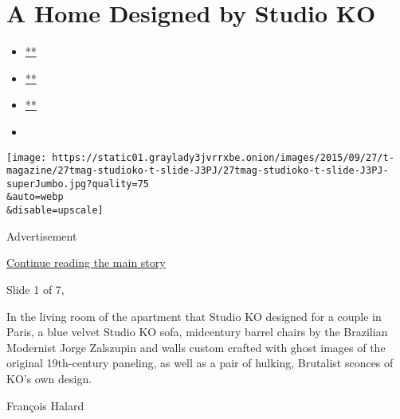 \hypertarget{a-home-designed-by-studio-ko}{%
\section{A Home Designed by Studio
KO}\label{a-home-designed-by-studio-ko}}

\begin{itemize}
\item
  \href{https://www.facebookcorewwwi.onion/sharer.php?app_id=9869919170\&u=https\%3A\%2F\%2Fwww.nytimes3xbfgragh.onion\%2Fslideshow\%2F2015\%2F09\%2F27\%2Ft-magazine\%2Fa-home-designed-by-studio-ko.html\%3Fsmid\%3Dfb-share\&name=A\%20Home\%20Designed\%20by\%20Studio\%20KO\&redirect_uri=https\%3A\%2F\%2Fwww.facebookcorewwwi.onion\%2F}{**}
\item
  \href{https://twitter.com/intent/tweet?url=https\%3A\%2F\%2Fwww.nytimes3xbfgragh.onion\%2Fslideshow\%2F2015\%2F09\%2F27\%2Ft-magazine\%2Fa-home-designed-by-studio-ko.html\%3Fsmid\%3Dtw-share\&text=A\%20Home\%20Designed\%20by\%20Studio\%20KO}{**}
\item
  \href{mailto:?subject=nytimes3xbfgragh.onion\%3A\%20A\%20Home\%20Designed\%20by\%20Studio\%20KO\&body=From\%20The\%20New\%20York\%20Times\%3A\%0A\%0AA\%20Home\%20Designed\%20by\%20Studio\%20KO\%0A\%0AThe\%20design\%20firm\%E2\%80\%99s\%2019th-century\%20Paris\%20apartment\%20is\%20injected\%20with\%20a\%20dash\%20of\%20Surrealism.\%0A\%0Ahttps\%3A\%2F\%2Fwww.nytimes3xbfgragh.onion\%2Fslideshow\%2F2015\%2F09\%2F27\%2Ft-magazine\%2Fa-home-designed-by-studio-ko.html\%3Fsmid\%3Dem-share}{**}
\item
\end{itemize}

\texttt{[image: https://static01.graylady3jvrrxbe.onion/images/2015/09/27/t-magazine/27tmag-studioko-t-slide-J3PJ/27tmag-studioko-t-slide-J3PJ-superJumbo.jpg?quality=75\\\&auto=webp\\\&disable=upscale]}

Advertisement

\protect\hyperlink{after-right-0}{Continue reading the main story}

Slide 1 of 7,

In the living room of the apartment that Studio KO designed for a couple
in Paris, a blue velvet Studio KO sofa, midcentury barrel chairs by the
Brazilian Modernist Jorge Zalszupin and walls custom crafted with ghost
images of the original 19th-century paneling, as well as a pair of
hulking, Brutalist sconces of KO's own design.

François Halard

